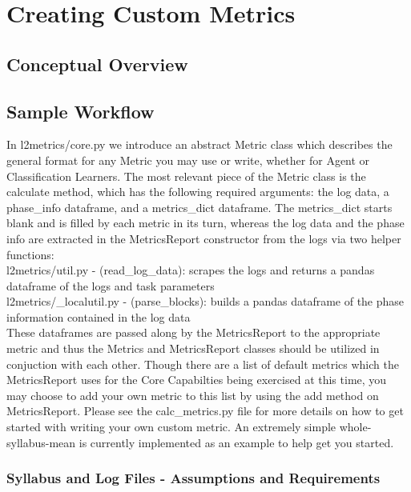 \chapter{Creating Custom Metrics}\label{ch:custom_metrics}

\section{Conceptual Overview} 

\section{Sample Workflow}

In l2metrics/core.py we introduce an abstract Metric class which describes the general format for any Metric you may use or write, whether for Agent or Classification Learners. The most relevant piece of the Metric class is the calculate method, which has the following required arguments: the log data, a phase\_info dataframe, and a metrics\_dict dataframe. The metrics\_dict starts blank and is filled by each metric in its turn, whereas the log data and the phase info are extracted in the MetricsReport constructor from the logs via two helper functions: \\[0.1in]

l2metrics/util.py - (read\_log\_data): scrapes the logs and returns a pandas dataframe of the logs and task parameters\\
l2metrics/\_localutil.py - (parse\_blocks): builds a pandas dataframe of the phase information contained in the log data\\[0.1in]

These dataframes are passed along by the MetricsReport to the appropriate metric and thus the Metrics and MetricsReport classes should be utilized in conjuction with each other. Though there are a list of default metrics which the MetricsReport uses for the Core Capabilties being exercised at this time, you may choose to add your own metric to this list by using the add method on MetricsReport. Please see the calc\_metrics.py file for more details on how to get started with writing your own custom metric. An extremely simple whole-syllabus-mean is currently implemented as an example to help get you started.


\subsection*{Syllabus and Log Files - Assumptions and Requirements}


